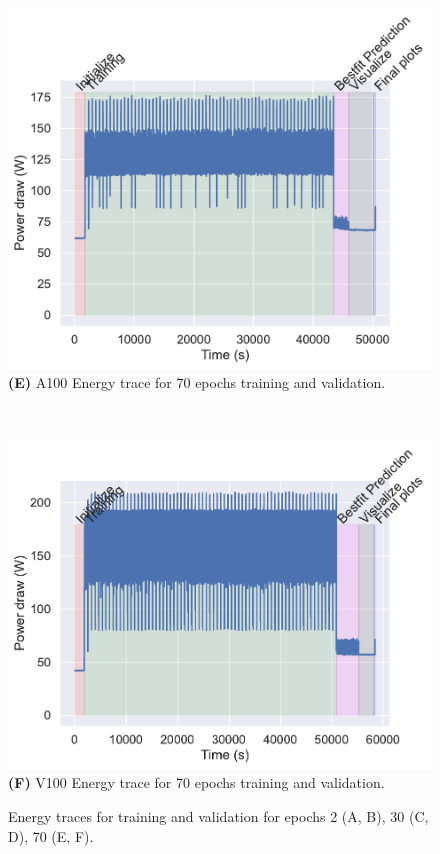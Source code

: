 \documentclass[utf8]{FrontiersinVancouver} %
\begin{document}
\begin{figure}[htb]
\begin{center}
     \begin{minipage}[b]{0.44\textwidth}
       \includegraphics[width=1.0\linewidth]{images/a100-shaded-energy-70-epochs.pdf}
        {\bf (E)} A100 Energy trace for 70 epochs training and validation.
     \end{minipage}
     \ \
     \begin{minipage}[b]{0.44\textwidth}
        \includegraphics[width=1.0\linewidth]{images/v100-shaded-energy-70-epochs.pdf}
        {\bf (F)}  V100 Energy trace for 70 epochs training and validation.
     \end{minipage}
\end{center}

     \caption{Energy traces for training and validation for epochs 2 (A, B), 30 (C, D), 70 (E, F).}
     \label{fig:energy-graphs}
\end{figure}
\end{document}
